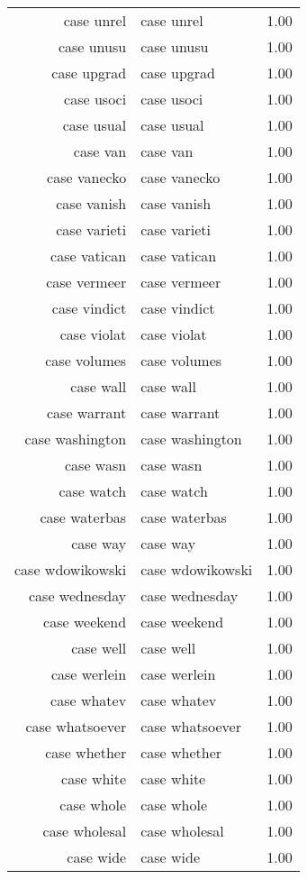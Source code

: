 \begin{table}[ht]
\begin{tabular}{rlr}
  case unrel & case unrel & 1.00 \\ 
  case unusu & case unusu & 1.00 \\ 
  case upgrad & case upgrad & 1.00 \\ 
  case usoci & case usoci & 1.00 \\ 
  case usual & case usual & 1.00 \\ 
  case van & case van & 1.00 \\ 
  case vanecko & case vanecko & 1.00 \\ 
  case vanish & case vanish & 1.00 \\ 
  case varieti & case varieti & 1.00 \\ 
  case vatican & case vatican & 1.00 \\ 
  case vermeer & case vermeer & 1.00 \\ 
  case vindict & case vindict & 1.00 \\ 
  case violat & case violat & 1.00 \\ 
  case volumes & case volumes & 1.00 \\ 
  case wall & case wall & 1.00 \\ 
  case warrant & case warrant & 1.00 \\ 
  case washington & case washington & 1.00 \\ 
  case wasn & case wasn & 1.00 \\ 
  case watch & case watch & 1.00 \\ 
  case waterbas & case waterbas & 1.00 \\ 
  case way & case way & 1.00 \\ 
  case wdowikowski & case wdowikowski & 1.00 \\ 
  case wednesday & case wednesday & 1.00 \\ 
  case weekend & case weekend & 1.00 \\ 
  case well & case well & 1.00 \\ 
  case werlein & case werlein & 1.00 \\ 
  case whatev & case whatev & 1.00 \\ 
  case whatsoever & case whatsoever & 1.00 \\ 
  case whether & case whether & 1.00 \\ 
  case white & case white & 1.00 \\ 
  case whole & case whole & 1.00 \\ 
  case wholesal & case wholesal & 1.00 \\ 
  case wide & case wide & 1.00 \\ 

\end{tabular}
\end{table}
